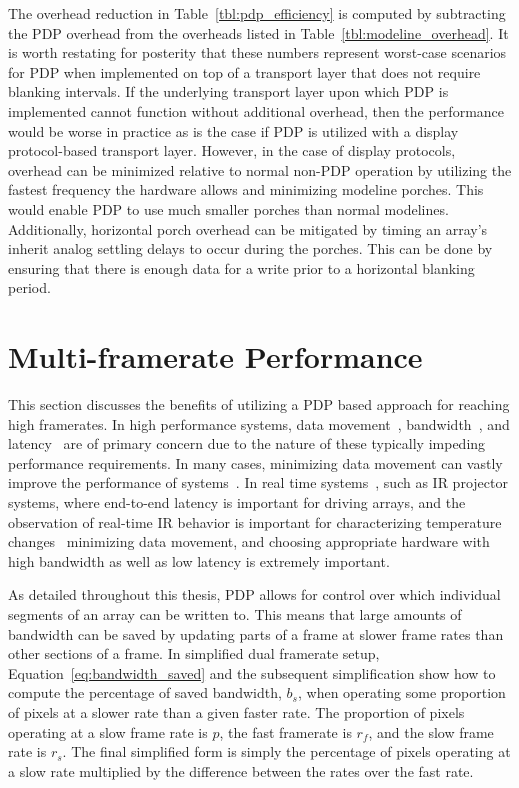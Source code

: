     The overhead reduction in Table~\ref{tbl:pdp_efficiency} is computed by subtracting the PDP overhead from the overheads listed in Table~\ref{tbl:modeline_overhead}. It is worth restating for posterity that these numbers represent worst-case scenarios for PDP when implemented on top of a transport layer that does not require blanking intervals. If the underlying transport layer upon which PDP is implemented cannot function without additional overhead, then the performance would be worse in practice as is the case if PDP is utilized with a display protocol-based transport layer. However, in the case of display protocols, overhead can be minimized relative to normal non-PDP operation by utilizing the fastest frequency the hardware allows and minimizing modeline porches. This would enable PDP to use much smaller porches than normal modelines. Additionally, horizontal porch overhead can be mitigated by timing an array's inherit analog settling delays to occur during the porches. This can be done by ensuring that there is enough data for a write prior to a horizontal blanking period.

\section{Multi-framerate Performance}
    \label{sec:multi_framerate_performance}

    This section discusses the benefits of utilizing a PDP based approach for reaching high framerates. In high performance systems, data movement~\cite{LeeEtAl1984}, bandwidth~\cite{LaiBaker1999}, and latency~\cite{ZhengEtAl2014} are of primary concern due to the nature of these typically impeding performance requirements. In many cases, minimizing data movement can vastly improve the performance of systems~\cite{BandyopadhyayCoyle2004,LiEtAl2009,Hall2020}. In real time systems~\cite{Kopetz2011}, such as IR projector systems, where end-to-end latency is important for driving arrays, and the observation of real-time IR behavior is important for characterizing temperature changes~\cite{ZhouEtAl2000} minimizing data movement, and choosing appropriate hardware with high bandwidth as well as low latency is extremely important.

    As detailed throughout this thesis, PDP allows for control over which individual segments of an array can be written to. This means that large amounts of bandwidth can be saved by updating parts of a frame at slower frame rates than other sections of a frame. In simplified dual framerate setup, Equation~\eqref{eq:bandwidth_saved} and the subsequent simplification show how to compute the percentage of saved bandwidth, $b_s$, when operating some proportion of pixels at a slower rate than a given faster rate. The proportion of pixels operating at a slow frame rate is $p$, the fast framerate is $r_f$, and the slow frame rate is $r_s$. The final simplified form is simply the percentage of pixels operating at a slow rate multiplied by the difference between the rates over the fast rate.

